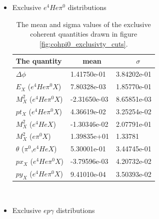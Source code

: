 \begin{itemize}
\item Exclusive $e^{4}He\pi^{0}$ distributions
\begin {table}[!h]
\begin{center}
\begin{tabular}{|l|l|l|}
\hline
The quantity &  ~~~mean & ~~~~~$\sigma$  \\
\hline
$\Delta \phi$ & 1.41750e-01  & 3.84202e-01 \\
\hline
$E_{X}$ ($e^{4}He\pi^{0} X$)     &  7.80328e-03 & 1.85770e-01 \\
\hline
$M^{2}_{X}$ ($e^{4}He\pi^{0} X$) &  -2.31650e-03 & 8.65851e-03 \\
\hline
$pt_{X}$ ($e^{4}He\pi^{0} X$)    & 4.36619e-02  & 3.25254e-02 \\
\hline
$M^{2}_{X}$ ($e^{4}HeX$) &  -1.30346e-02 & 2.07791e-01 \\
\hline
$M^{2}_{X}$ ($e\pi^{0} X$)  & 1.39835e+01 & 1.33781\\
\hline
$\theta$ ($\pi^{0}$,$e^{4}HeX$) & 5.30001e-01  & 3.44745e-01\\
\hline
$px_{X}$ ($e^{4}He\pi^{0} X$)    &   -3.79596e-03  &  4.20732e-02\\
\hline
 $py_{X}$ ($e^{4}He\pi^{0} X$)    &   9.41010e-04  & 3.50393e-02 \\
\hline
\end{tabular}
\caption{ The mean and sigma values of the exclusive coherent quantities drawn in figure \ref{fig:cohpi0_exclusivty_cuts}.}
\label{Table:cohpi0_exclusivity_cuts}
\end{center}
\end{table}


~\newpage
\item Exclusive $ep\gamma$ distributions


\end{itemize}
